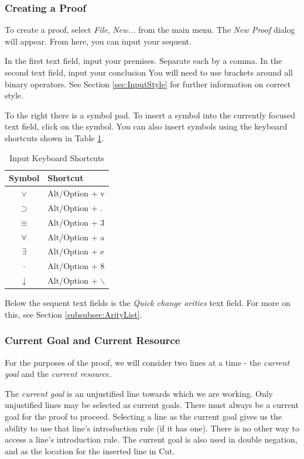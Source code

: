 \documentclass[a4paper]{article}
\begin{document}
\subsubsection{Creating a Proof}
To create a proof, select \emph{File}, \emph{New...} from the main menu. The \emph{New Proof} dialog will appear. From here, you can input your sequent.

In the first text field, input your premises. Separate each by a comma. In the second text field, input your conclusion You will need to use brackets around all binary operators. See Section \ref{sec:InputStyle} for further information on correct style.

To the right there is a symbol pad. To insert a symbol into the currently focused text field, click on the symbol. You can also insert symbols using the keyboard shortcuts shown in Table \ref{tab:InputKeyboardShortcuts}.

\begin{table}
	\centering
		\begin{tabular}{c | l}
			Symbol & Shortcut \\
			\hline
			$\vee$ & Alt/Option + v \\
			$\supset$ & Alt/Option + .\\
			$\equiv$ & Alt/Option + 3\\
			$\forall$ & Alt/Option + a\\
			$\exists$ & Alt/Option + e\\
			$\cdot$ & Alt/Option + 8\\
			$\downarrow$ & Alt/Option + $\backslash$
		\end{tabular}
	\caption{Input Keyboard Shortcuts}
	\label{tab:InputKeyboardShortcuts}
\end{table}

Below the sequent text fields is the \emph{Quick change arities} text field. For more on this, see Section \ref{subsubsec:ArityList}.


\subsubsection{Current Goal and Current Resource}
For the purposes of the proof, we will consider two lines at a time - the \emph{current goal} and the \emph{current resource}.

The \emph{current goal} is an unjustified line towards which we are working. Only unjustified lines may be selected as current goals. There must always be a current goal for the proof to proceed. Selecting a line as the current goal gives us the ability to use that line's introduction rule (if it has one). There is no other way to access a line's introduction rule. The current goal is also used in double negation, and as the location for the inserted line in Cut.
\end{document}
